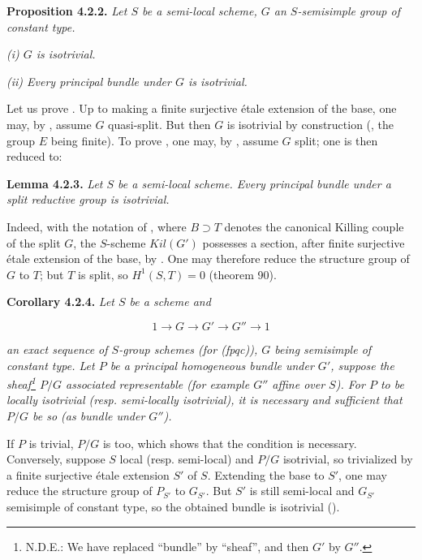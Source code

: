 \textbf{Proposition 4.2.2.} \emph{Let \(S\) be a semi-local scheme, \(G\) an \(S\)-semisimple group of constant type.}

\emph{(i) \(G\) is isotrivial.}

\emph{(ii) Every principal bundle under \(G\) is isotrivial.}

Let us prove . Up to making a finite surjective étale extension of the base, one may, by , assume \(G\)
quasi-split. But then \(G\) is isotrivial by construction (, the group \(E\) being finite). To prove , one may, by
, assume \(G\) split; one is then reduced to:

\textbf{Lemma 4.2.3.} \emph{Let \(S\) be a semi-local scheme. Every principal bundle under a split reductive group is isotrivial.}

Indeed, with the notation of , where \(B \supset T\) denotes the canonical Killing couple of the split \(G\), the
\(S\)-scheme \(Kil(G')\) possesses a section, after finite surjective étale extension of the base, by . One may
therefore reduce the structure group of \(G\) to \(T\); but \(T\) is split, so \(H^{1}(S, T) = 0\) (theorem 90).

\textbf{Corollary 4.2.4.} \emph{Let \(S\) be a scheme and}

\[ 1 \to G \to G' \to G'' \to 1 \]

\emph{an exact sequence of \(S\)-group schemes (for (fpqc)), \(G\) being semisimple of constant type. Let \(P\) be a principal
homogeneous bundle under \(G'\), suppose the sheaf\footnote{N.D.E.: We have replaced ``bundle'' by ``sheaf'', and then \(G'\) by \(G''\).} \(P / G\) associated representable (for example \(G''\)
affine over \(S\)). For \(P\) to be locally isotrivial (resp. semi-locally isotrivial), it is necessary and sufficient that
\(P / G\) be so (as bundle under \(G''\)).}

If \(P\) is trivial, \(P / G\) is too, which shows that the condition is necessary. Conversely, suppose \(S\) local (resp.
semi-local) and \(P / G\) isotrivial, so trivialized by a finite surjective étale extension \(S'\) of \(S\). Extending the
base to \(S'\), one may reduce the structure group of \(P_{S'}\) to \(G_{S'}\). But \(S'\) is still semi-local and \(G_{S'}\)
semisimple of constant type, so the obtained bundle is isotrivial ().

